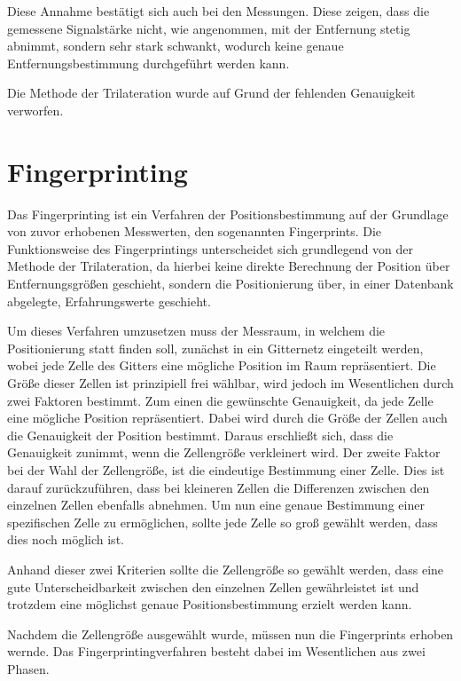 Diese Annahme bestätigt sich auch bei den Messungen. Diese zeigen, dass die gemessene Signalstärke nicht, wie angenommen, mit der Entfernung stetig abnimmt, sondern sehr stark schwankt, wodurch keine genaue Entfernungsbestimmung durchgeführt werden kann.

Die Methode der Trilateration wurde auf Grund der fehlenden Genauigkeit verworfen. 

\section{Fingerprinting}
\label{sec:implementation:fingerprinting}
Das Fingerprinting ist ein Verfahren der Positionsbestimmung auf der Grundlage von zuvor erhobenen Messwerten, den sogenannten Fingerprints.
Die Funktionsweise des Fingerprintings unterscheidet sich grundlegend von der Methode der Trilateration, da hierbei keine direkte Berechnung der Position über Entfernungsgrößen geschieht, sondern die Positionierung über, in einer Datenbank abgelegte, Erfahrungswerte geschieht.

Um dieses Verfahren umzusetzen muss der Messraum, in welchem die Positionierung statt finden soll, zunächst in ein Gitternetz eingeteilt werden, wobei jede Zelle des Gitters eine mögliche Position im Raum repräsentiert. Die Größe dieser Zellen ist prinzipiell frei wählbar, wird jedoch im Wesentlichen durch zwei Faktoren bestimmt. 
Zum einen die gewünschte Genauigkeit, da jede Zelle eine mögliche Position repräsentiert. Dabei wird durch die Größe der Zellen auch die Genauigkeit der Position bestimmt. Daraus erschließt sich, dass die Genauigkeit zunimmt, wenn die Zellengröße verkleinert wird.
Der zweite Faktor bei der Wahl der Zellengröße, ist die eindeutige Bestimmung einer Zelle. Dies ist darauf zurückzuführen, dass bei kleineren Zellen die Differenzen zwischen den einzelnen Zellen ebenfalls abnehmen. Um nun eine genaue Bestimmung einer spezifischen Zelle zu ermöglichen, sollte jede Zelle so groß gewählt werden, dass dies noch möglich ist.

Anhand dieser zwei Kriterien sollte die Zellengröße so gewählt werden, dass eine gute Unterscheidbarkeit zwischen den einzelnen Zellen gewährleistet ist und trotzdem eine möglichst genaue Positionsbestimmung erzielt werden kann.


Nachdem die Zellengröße ausgewählt wurde, müssen nun die Fingerprints erhoben wernde.
Das Fingerprintingverfahren besteht dabei im Wesentlichen aus zwei Phasen.

